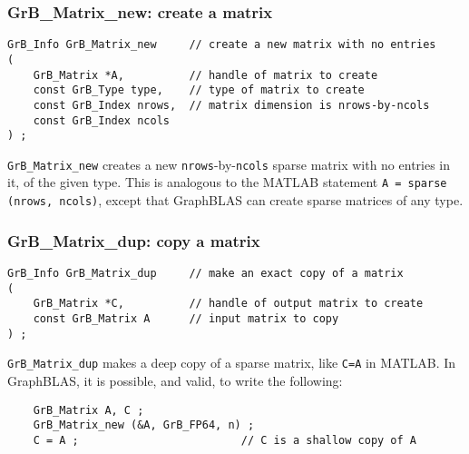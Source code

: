 \documentclass[12pt]{article}
\begin{document}
\subsubsection{{\sf GrB\_Matrix\_new:}          create a matrix}
\label{matrix_new}

\begin{mdframed}[userdefinedwidth=6in]
{\footnotesize
\begin{verbatim}
GrB_Info GrB_Matrix_new     // create a new matrix with no entries
(
    GrB_Matrix *A,          // handle of matrix to create
    const GrB_Type type,    // type of matrix to create
    const GrB_Index nrows,  // matrix dimension is nrows-by-ncols
    const GrB_Index ncols
) ;
\end{verbatim} } \end{mdframed}

\verb'GrB_Matrix_new' creates a new \verb'nrows'-by-\verb'ncols' sparse matrix
with no entries in it, of the given type.  This is analogous to the MATLAB
statement \verb'A = sparse (nrows, ncols)', except that GraphBLAS can create
sparse matrices of any type.

\subsubsection{{\sf GrB\_Matrix\_dup:}          copy a matrix}
\label{matrix_dup}

\begin{mdframed}[userdefinedwidth=6in]
{\footnotesize
\begin{verbatim}
GrB_Info GrB_Matrix_dup     // make an exact copy of a matrix
(
    GrB_Matrix *C,          // handle of output matrix to create
    const GrB_Matrix A      // input matrix to copy
) ;
\end{verbatim} } \end{mdframed}

\verb'GrB_Matrix_dup' makes a deep copy of a sparse matrix, like \verb'C=A' in
MATLAB.  In GraphBLAS, it is possible, and valid, to write the following:

    {\footnotesize
    \begin{verbatim}
    GrB_Matrix A, C ;
    GrB_Matrix_new (&A, GrB_FP64, n) ;
    C = A ;                         // C is a shallow copy of A  \end{verbatim}}
\end{document}
